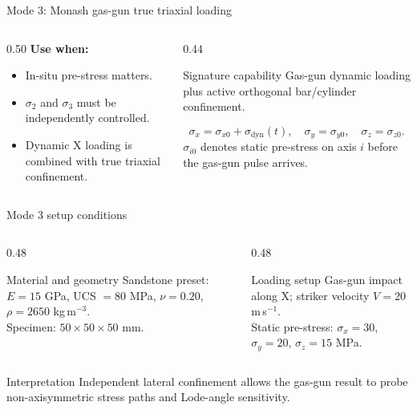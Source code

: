 \documentclass[11pt,aspectratio=169]{beamer}
\newcommand{\cncue}[1]{{\footnotesize\color{TUSTmidgray} #1}}
\begin{document}
\begin{frame}{Mode 3: Monash gas-gun true triaxial loading}
  \begin{columns}[T,onlytextwidth]
    \begin{column}{0.50\textwidth}
      \textbf{Use when:}
      \begin{itemize}
        \item In-situ pre-stress matters.
        \item $\sigma_2$ and $\sigma_3$ must be independently controlled.
        \item Dynamic X loading is combined with true triaxial confinement.
      \end{itemize}
    \end{column}
    \begin{column}{0.44\textwidth}
      \begin{exampleblock}{Signature capability}
        Gas-gun dynamic loading plus active orthogonal bar/cylinder confinement.
      \end{exampleblock}
      \[
        \sigma_x=\sigma_{x0}+\sigma_{\mathrm{dyn}}(t), \quad
        \sigma_y=\sigma_{y0}, \quad \sigma_z=\sigma_{z0}.
      \]
      \cncue{$\sigma_{i0}$ denotes static pre-stress on axis $i$ before the gas-gun pulse arrives.}
    \end{column}
  \end{columns}
\end{frame}

\begin{frame}{Mode 3 setup conditions}
  \small
  \begin{columns}[T,onlytextwidth]
    \begin{column}{0.48\textwidth}
      \begin{block}{Material and geometry}
        Sandstone preset: $E=15$ GPa, UCS $=80$ MPa, $\nu=0.20$,
        $\rho=2650$ kg\,m$^{-3}$.\\[3pt]
        Specimen: $50\times50\times50$ mm.
      \end{block}
    \end{column}
    \begin{column}{0.48\textwidth}
      \begin{exampleblock}{Loading setup}
        Gas-gun impact along X; striker velocity $V=20$ m\,s$^{-1}$.\\[3pt]
        Static pre-stress: $\sigma_x=30$, $\sigma_y=20$,
        $\sigma_z=15$ MPa.
      \end{exampleblock}
    \end{column}
  \end{columns}
  \vspace{0.2cm}
  \begin{block}{Interpretation}
    Independent lateral confinement allows the gas-gun result to probe
    non-axisymmetric stress paths and Lode-angle sensitivity.
  \end{block}
\end{frame}
\end{document}
